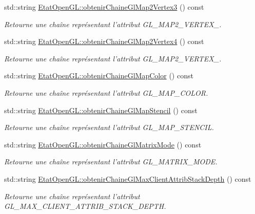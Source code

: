 \begin{DoxyCompactItemize}
std\-::string \hyperlink{group__utilitaire_ga7d031ab910660e0f56b3ed4a95d2bfc6}{Etat\-Open\-G\-L\-::obtenir\-Chaine\-Gl\-Map2\-Vertex3} () const 
\begin{DoxyCompactList}\small\item\em Retourne une chaîne représentant l'attribut G\-L\-\_\-\-M\-A\-P2\-\_\-\-V\-E\-R\-T\-E\-X\-\_. \end{DoxyCompactList}\item 
std\-::string \hyperlink{group__utilitaire_ga866e31b0b0469c11f0c0bee0bb4f9973}{Etat\-Open\-G\-L\-::obtenir\-Chaine\-Gl\-Map2\-Vertex4} () const 
\begin{DoxyCompactList}\small\item\em Retourne une chaîne représentant l'attribut G\-L\-\_\-\-M\-A\-P2\-\_\-\-V\-E\-R\-T\-E\-X\-\_. \end{DoxyCompactList}\item 
std\-::string \hyperlink{group__utilitaire_ga7224b43655a9b3d8a381bea11d42d401}{Etat\-Open\-G\-L\-::obtenir\-Chaine\-Gl\-Map\-Color} () const 
\begin{DoxyCompactList}\small\item\em Retourne une chaîne représentant l'attribut G\-L\-\_\-\-M\-A\-P\-\_\-\-C\-O\-L\-O\-R. \end{DoxyCompactList}\item 
std\-::string \hyperlink{group__utilitaire_ga17a6e4887be554b1845d8eb595129b0c}{Etat\-Open\-G\-L\-::obtenir\-Chaine\-Gl\-Map\-Stencil} () const 
\begin{DoxyCompactList}\small\item\em Retourne une chaîne représentant l'attribut G\-L\-\_\-\-M\-A\-P\-\_\-\-S\-T\-E\-N\-C\-I\-L. \end{DoxyCompactList}\item 
std\-::string \hyperlink{group__utilitaire_ga3cb5f2ef622bebc2786449eda2460d55}{Etat\-Open\-G\-L\-::obtenir\-Chaine\-Gl\-Matrix\-Mode} () const 
\begin{DoxyCompactList}\small\item\em Retourne une chaîne représentant l'attribut G\-L\-\_\-\-M\-A\-T\-R\-I\-X\-\_\-\-M\-O\-D\-E. \end{DoxyCompactList}\item 
std\-::string \hyperlink{group__utilitaire_ga2085416ccd06cb60bc98ba2207174dd1}{Etat\-Open\-G\-L\-::obtenir\-Chaine\-Gl\-Max\-Client\-Attrib\-Stack\-Depth} () const 
\begin{DoxyCompactList}\small\item\em Retourne une chaîne représentant l'attribut G\-L\-\_\-\-M\-A\-X\-\_\-\-C\-L\-I\-E\-N\-T\-\_\-\-A\-T\-T\-R\-I\-B\-\_\-\-S\-T\-A\-C\-K\-\_\-\-D\-E\-P\-T\-H. \end{DoxyCompactList}\item 

\end{DoxyCompactItemize}
